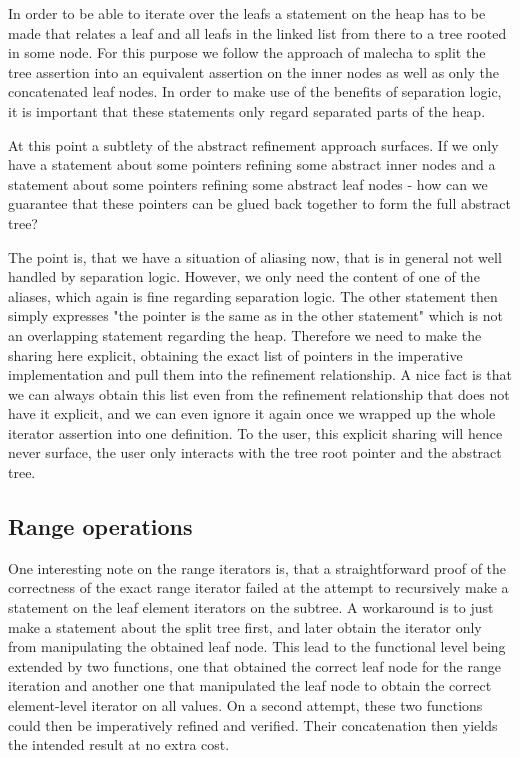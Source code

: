 \documentclass[a4paper,UKenglish,cleveref, autoref, thm-restate]{lipics-v2021}
\begin{document}
In order to be able to iterate over the leafs
a statement on the heap has to be made that relates
a leaf and all leafs in the linked list from there
to a tree rooted in some node.
For this purpose we follow the approach of malecha
to split the tree assertion into an equivalent assertion
on the inner nodes as well as only the concatenated leaf nodes.
In order to make use of the benefits of separation logic,
it is important that these statements only regard separated parts of the heap.

At this point a subtlety of the abstract refinement approach surfaces.
If we only have a statement about some pointers refining some abstract inner nodes
and a statement about some pointers refining some abstract leaf nodes - 
how can we guarantee that these pointers can be glued back together to form the
full abstract tree?

The point is, that we have a situation of aliasing now,
that is in general not well handled by separation logic.
However, we only need the content of one of the aliases, which again is fine
regarding separation logic.
The other statement then simply expresses "the pointer is the same as in the other statement"
which is not an overlapping statement regarding the heap.
Therefore we need to make the sharing here explicit,
obtaining the exact list of pointers in the imperative implementation
and pull them into the refinement relationship.
A nice fact is that we can always obtain this list even from the
refinement relationship that does not have it explicit,
and we can even ignore it again once we wrapped up the whole
iterator assertion into one definition.
To the user, this explicit sharing will hence never surface,
the user only interacts with the tree root pointer and the abstract tree.

\subsection{Range operations}
\label{sec:imperative_range}

One interesting note on the range iterators is, that a
straightforward proof of the correctness of the exact range iterator
failed at the attempt to recursively make a statement on
the leaf element iterators on the subtree.
A workaround is to just make a statement about the split tree first,
and later obtain the iterator only from manipulating the obtained leaf node.
This lead to the functional level being extended by two functions,
one that obtained the correct leaf node for the range iteration
and another one that manipulated the leaf node to obtain
the correct element-level iterator on all values.
On a second attempt, these two functions could then be imperatively
refined and verified.
Their concatenation then yields the intended result at no extra cost.
\end{document}
